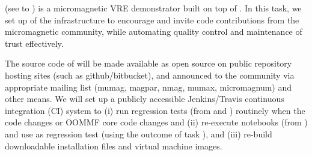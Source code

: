 \begin{workpackage}
\begin{tasklist}
\begin{task}[id=dissemination-of-oommf-nb-virtual-environment,
  title=Demonstrator: Open source micromagnetic VRE,
  lead=USO,PM=4]
  \OOMMFNB{} (see  to
  ) is a micromagnetic
  VRE demonstrator built on top of \TheProject. 
  In this task, we set up of the infrastructure to encourage and
  invite code contributions from the micromagnetic community, while
  automating quality control and maintenance of trust effectively. 

  The source code of \OOMMFNB{} will be made available as open source
  on public repository hosting sites (such as github/bitbucket), and
  announced to the community via appropriate mailing list (mumag,
  magpar, nmag, mumax, micromagnum) and other means. We will set up a
  publicly accessible Jenkins/Travis continuous integration (CI)
  system to (i) run regression tests (from
   and
  ) routinely when the
  \OOMMFNB{} code changes or OOMMF core code changes and (ii)
  re-execute notebooks (from
  ) and use as
  regression test (using the outcome of task
  ), and (iii) re-build
  downloadable installation files and virtual machine images. 


\end{task}

\begin{task}[title=Micromagnetic VRE dissemination workshops,
id=dissemination-of-oommf-nb-workshops,lead=USO,PM=6]



\end{task}
\end{tasklist}
\end{workpackage}
